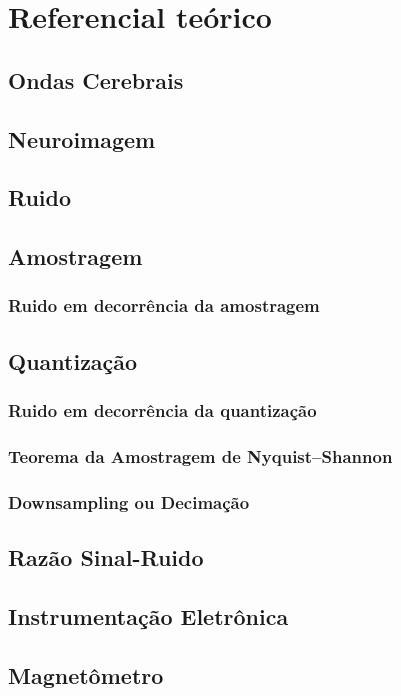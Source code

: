 \chapter{Referencial teórico}
\section{Ondas Cerebrais}
\section{Neuroimagem}
\section{Ruido}
\section{Amostragem}
\subsection{Ruido em decorrência da amostragem}
\section{Quantização}
\subsection{Ruido em decorrência da quantização}
\subsection{Teorema da Amostragem de Nyquist–Shannon}
\subsection{Downsampling ou Decimação}
\section{Razão Sinal-Ruido}
\section{Instrumentação Eletrônica}
\section{Magnetômetro}
